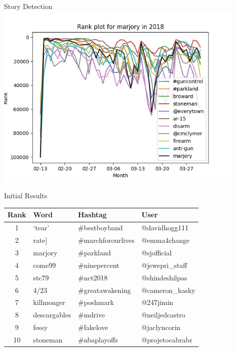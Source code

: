 \documentclass{beamer}
\begin{document}
\begin{frame}{Story Detection}
  \includegraphics[width=0.9\textwidth]{marjory-2018-shock-event-comparison.jpg}
\end{frame}

\begin{frame}{Initial Results}
    \begin{tabular}{clll}
        \toprule
        Rank & Word & Hashtag & User \\
        \midrule
        1 & `tear' & \#bestboyband & @davidhogg111 \\
    2 & rate] & \#marchforourlives & @emma4change \\
        3 & marjory & \#parkland & @sjofficial \\
        4 & come99 & \#ninepercent & @jewepri\_staff \\
        5 & stc79 & \#nct2018 & @shindeshilpas \\
        6 & 4/23 & \#greatawakening & @cameron\_kasky \\
        7 & killmonger & \#poshmark & @247jimin \\
        8 & descargables & \#mdrive & @neiljedcastro \\
        9 & fessy & \#fakelove & @jaclyncorin \\
        10 & stoneman & \#nbaplayoffs & @projetocabrabr\\
        \bottomrule
    \end{tabular}
\end{frame}
\end{document}
